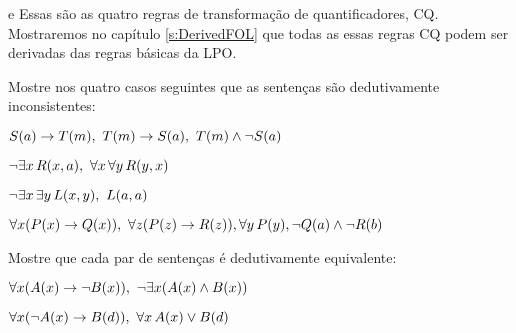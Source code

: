  
e
Essas são as quatro regras de transformação de quantificadores, CQ. Mostraremos no  capítulo \ref{s:DerivedFOL} que todas as essas regras CQ podem ser derivadas das regras básicas da LPO. 


\practiceproblems
\problempart
 Mostre nos quatro casos seguintes que as sentenças são dedutivamente inconsistentes:
\begin{earg}
\item $\mathord{S}(a)\rightarrow \mathord{T}(m),\,\, \mathord{T}(m) \rightarrow \mathord{S}(a),\,\, \mathord{T}(m) \wedge \neg \mathord{S}(a)$
\item $\neg\exists x\,\mathord{R}(x,a),\,\,  \forall x\, \forall y\,\mathord{R}(y,x)$
\item $\neg\exists x\, \exists y\,\mathord{L}(x,y),\,\,  \mathord{L}(a,a)$
\item $\forall x(\mathord{P}(x) \rightarrow \mathord{Q}(x)),\,\,  \forall z(\mathord{P}(z) \rightarrow \mathord{R}(z)), \forall y\,\mathord{P}(y), \neg \mathord{Q}(a) \wedge \neg \mathord{R}(b)$
\end{earg}

\problempart
Mostre que cada par de sentenças é dedutivamente equivalente:
\begin{earg}
\item $\forall x (\mathord{A}(x)\rightarrow \neg \mathord{B}(x)),\,\,  \neg\exists x(\mathord{A}(x) \wedge \mathord{B}(x))$
\item $\forall x (\neg\mathord{A}(x)\rightarrow \mathord{B}(d)),\,\,  \forall x\,\mathord{A}(x) \vee \mathord{B}(d)$
\end{earg}

